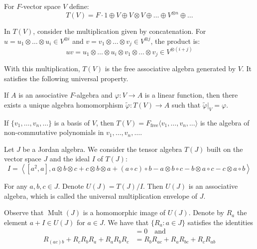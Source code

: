 \documentclass{article}
\def\<{\mathop{\langle}}
\def\>{\mathop{\rangle}}
\begin{document}
For $ F $-vector space $ V $ define:
\[
T(V)= F \cdot 1 \oplus V \oplus V \otimes V \oplus \ldots \oplus V^{\otimes n} \oplus \ldots
\] 

In $T(V)$, consider the multiplication given by concatenation. For $u = u_1 \otimes \dots \otimes u_i \in V^{\otimes i}$ and $v = v_1 \otimes \dots \otimes v_j \in V^{\otimes j}$, the product is:  
\[  
uv = u_1 \otimes \dots \otimes u_i \otimes v_1 \otimes \dots \otimes v_j \in V^{\otimes (i+j)}  
\]  

With this multiplication, $T(V)$ is the free associative algebra generated by $V$. It satisfies the following universal property.  

If $A$ is an associative $F$-algebra and $\varphi: V \to A$ is a linear function, then there exists a unique algebra homomorphism $\tilde{\varphi}: T(V) \to A$ such that $\tilde{\varphi}|_V = \varphi$.  

\vspace{1cm}  
\begin{center}  
\end{center}  
\vspace{1cm} 

If $\{v_1, \dots, v_n, \dots\}$ is a basis of $V$, then $T(V) = F_{\text{free}}\langle v_1, \dots, v_n, \dots \rangle$ is the algebra of non-commutative polynomials in $v_1, \dots, v_n, \dots$.  
  
Let $J$ be a Jordan algebra. We consider the tensor algebra $T(J)$ built on the vector space $J$ and the ideal $I$ of $T(J)$:  
\[
I=\< [a^2,a], a\otimes b\otimes c+c\otimes b\otimes a+(a \circ c)\circ b - a\otimes b \circ c - b\otimes a\circ c - c\otimes a \circ b \>
\]  

For any $ a,b,c \in J $. Denote $U(J) = T(J)/I$. Then $U(J)$ is an associative algebra, which is called the universal multiplication envelope of $J$.  

Observe that $\operatorname{Mult}(J)$ is a homomorphic image of $U(J)$.  
Denote by $R_a$ the element $a+I \in U(J)$ for $a \in J$. We have that $\{R_a : a \in J\}$ satisfies the identities  
\begin{align*}  
    [R_a, R_{a^2}] &= 0 \quad \text{and} \\
    R_{(ac)b} + R_c R_b R_a + R_a R_b R_c &= R_b R_{ac} + R_a R_{bc} + R_c R_{ab}  
\end{align*}  
\end{document}
